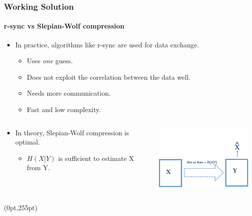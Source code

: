 \documentclass[xcolor=dvipsnames]{beamer}
\newcommand\hypercorner[1]{%
  \begin{textblock*}{\paperwidth}(0pt,255pt)
    \raggedleft #1\hspace{.5em}
  \end{textblock*}}
\begin{document}
\begin{frame}[label= rsynccomp]
\frametitle{Working Solution}
\framesubtitle{r-sync vs Slepian-Wolf compression}
\begin{itemize}
\item In practice, algorithms like r-sync are used for data exchange.
\begin{itemize}
\item Uses \emph{one} guess.
\item Does not exploit the correlation between the data well.
\item Needs more communication.
\item Fast and low complexity.
\end{itemize}
\end{itemize}
\begin{minipage}[0.5\textheight]{\textwidth}
\begin{columns}
\begin{column}{0.4\textwidth}
\begin{itemize}
\item In theory, Slepian-Wolf compression is optimal. 
\begin{itemize}
\item $H(X|Y)$ is sufficient to estimate X from Y.
\end{itemize}
\end{itemize}
\end{column}
\begin{column}{0.5\textwidth}
\includegraphics[width=5.2cm]{./swcompp.png}
\end{column}
\end{columns}
\end{minipage}
\hypercorner{\hyperlink{rsync}{}}
\end{frame}
\end{document}
